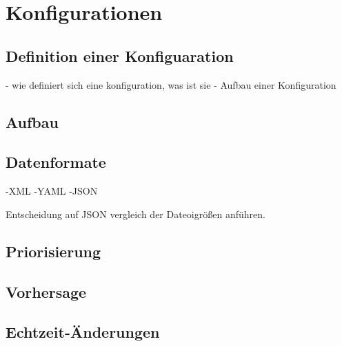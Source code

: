 \chapter{Konfigurationen}

\section{Definition einer Konfiguaration}
- wie definiert sich eine konfiguration, was ist sie
- Aufbau einer Konfiguration

\section{Aufbau}
\section{Datenformate}
-XML
-YAML
-JSON 

Entscheidung auf JSON vergleich der Dateoigrößen anführen.




\section{Priorisierung}
\section{Vorhersage}
\section{Echtzeit-Änderungen}
